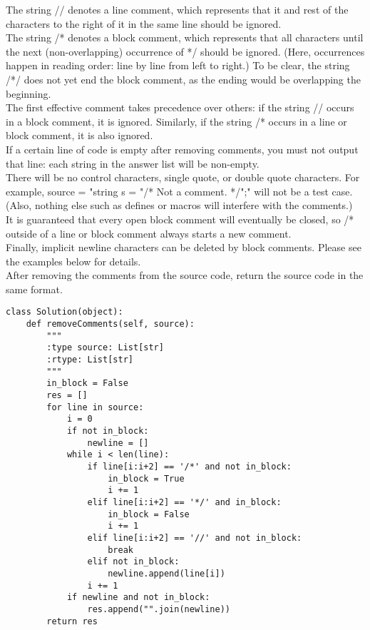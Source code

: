 The string // denotes a line comment, which represents that it and rest of the characters to the right of it in the same line should be ignored.\\

The string /* denotes a block comment, which represents that all characters until the next (non-overlapping) occurrence of */ should be ignored. (Here, occurrences happen in reading order: line by line from left to right.) To be clear, the string /*/ does not yet end the block comment, as the ending would be overlapping the beginning.\\

The first effective comment takes precedence over others: if the string // occurs in a block comment, it is ignored. Similarly, if the string /* occurs in a line or block comment, it is also ignored.\\

If a certain line of code is empty after removing comments, you must not output that line: each string in the answer list will be non-empty.\\

There will be no control characters, single quote, or double quote characters. For example, source = "string s = "/* Not a comment. */";" will not be a test case. (Also, nothing else such as defines or macros will interfere with the comments.)\\

It is guaranteed that every open block comment will eventually be closed, so /* outside of a line or block comment always starts a new comment.\\

Finally, implicit newline characters can be deleted by block comments. Please see the examples below for details.\\

After removing the comments from the source code, return the source code in the same format.\\

\begin{lstlisting}
class Solution(object):
    def removeComments(self, source):
        """
        :type source: List[str]
        :rtype: List[str]
        """
        in_block = False
        res = []
        for line in source:
            i = 0
            if not in_block:
                newline = []
            while i < len(line):
                if line[i:i+2] == '/*' and not in_block:
                    in_block = True
                    i += 1
                elif line[i:i+2] == '*/' and in_block:
                    in_block = False
                    i += 1
                elif line[i:i+2] == '//' and not in_block:
                    break
                elif not in_block:
                    newline.append(line[i])
                i += 1
            if newline and not in_block:
                res.append("".join(newline))
        return res
\end{lstlisting}
        
